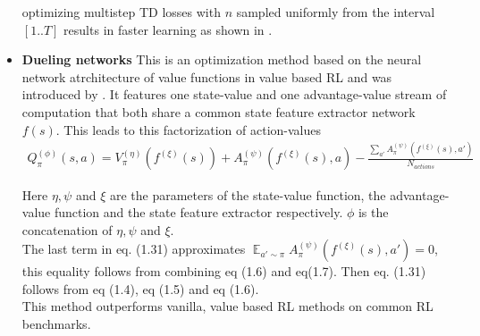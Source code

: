 \begin{itemize}
	optimizing multistep TD losses with $n$ sampled uniformly from the interval $[1..T]$ results in faster learning as shown in \cite{SBQL}.
	
	\item \textbf{Dueling networks} This is an optimization method based on the neural network atrchitecture of value functions in value based RL and was introduced by \cite{DBLP:journals/corr/WangFL15}. It features one state-value and one advantage-value stream of computation that both share a common state feature extractor network $f(s)$. This leads to this factorization of action-values
	\begin{align}
		Q_{\pi}^{(\phi)}(s, a) = V_{\pi}^{(\eta)}(f^{(\xi)}(s)) + A_{\pi}^{(\psi)}(f^{(\xi)}(s), a) - \frac{\sum_{a'} A_{\pi}^{(\psi)}(f^{(\xi)}(s), a')}{N_{actions}}
	\end{align}
	
	Here $\eta, \psi$ and $\xi$ are the parameters of the state-value function, the advantage-value function and the state feature extractor respectively. $\phi$ is the concatenation of $\eta, \psi$ and $\xi$.\\
	The last term in eq. (1.31) approximates $\mathop{\mathbb{E}}_{a' \sim \pi} A_{\pi}^{(\psi)}(f^{(\xi)}(s), a')=0$, this equality follows from combining eq (1.6) and eq(1.7). Then eq. (1.31) follows from eq (1.4), eq (1.5) and eq (1.6).\\
	This method outperforms vanilla, value based RL methods on common RL benchmarks. 
	
\end{itemize}

